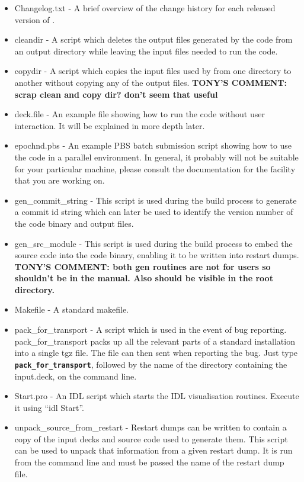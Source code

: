 \documentclass[12pt,a4paper]{article}
\newcommand{\inlinecode}[1]{{\color{warwickred} \bf\texttt{#1}}}
\newcommand{\EPOCH}{{\color{warwickdark}\fontfamily{phv}\selectfont{EPOCH}}}
\newcommand{\tony}[1]{{\color{warwickred} \bf{TONY'S COMMENT:} \bf{#1}}\\}
\begin{document}
\begin{itemize}
\item Changelog.txt - A brief overview of the change history for each
  released version of {\EPOCH}.
\item cleandir - A script which deletes the output files generated by the
  {\EPOCH} code from an output directory while leaving the input files needed to
  run the code.
\item copydir - A script which copies the input files used by {\EPOCH} from one
  directory to another without copying any of the output files.
\tony{scrap clean and copy dir? don't seem that useful}
\item deck.file - An example file showing how to run the code without user
  interaction. It will be explained in more depth later.
\item epoch{n}d.pbs - An example PBS batch submission script showing how to use
  the code in a parallel environment. In general, it probably will not be
  suitable for your particular machine, please consult the documentation for
  the facility that you are working on.
\item gen\_commit\_string - This script is used during the build process to
  generate a commit id string which can later be used to identify the version
  number of the code binary and output files.
\item gen\_src\_module - This script is used during the build process to
  embed the source code into the code binary, enabling it to be written into
  restart dumps.
  \tony{both gen routines are not for users so shouldn't be in the manual.
  Also should be visible in the root directory.}
\item Makefile - A standard makefile.
\item pack\_for\_transport - A script which is used in the event of bug
  reporting. pack\_for\_transport packs up all the relevant parts of a
  standard {\EPOCH} installation into a single tgz file. The file can then sent
  when reporting the bug. Just type \inlinecode{pack\_for\_transport}, followed
  by the name of the directory containing the input.deck, on the command line.
\item Start.pro - An IDL script which starts the IDL visualisation
  routines. Execute it using ``idl Start''.
\item unpack\_source\_from\_restart - Restart dumps can be written to contain
  a copy of the input decks and source code used to generate them. This script
  can be used to unpack that information from a given restart dump. It is run
  from the command line and must be passed the name of the restart dump file.
\end{itemize}
\end{document}
